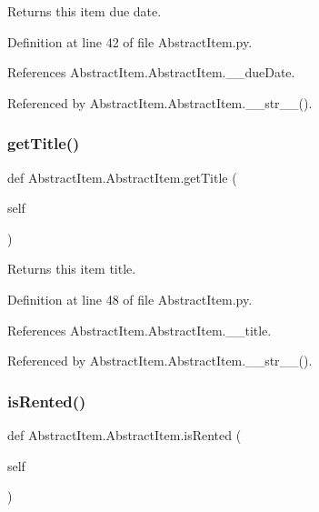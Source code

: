 Returns this item due date. 



Definition at line 42 of file Abstract\+Item.\+py.



References Abstract\+Item.\+Abstract\+Item.\+\_\+\+\_\+due\+Date.



Referenced by Abstract\+Item.\+Abstract\+Item.\+\_\+\+\_\+str\+\_\+\+\_\+().

\mbox{\label{classAbstractItem_1_1AbstractItem_a9ab1907f5110c1047957f2d1f4bebb82}} 
\subsubsection{\texorpdfstring{get\+Title()}{getTitle()}}
{\footnotesize\ttfamily def Abstract\+Item.\+Abstract\+Item.\+get\+Title (\begin{DoxyParamCaption}\item[{}]{self }\end{DoxyParamCaption})}



Returns this item title. 



Definition at line 48 of file Abstract\+Item.\+py.



References Abstract\+Item.\+Abstract\+Item.\+\_\+\+\_\+title.



Referenced by Abstract\+Item.\+Abstract\+Item.\+\_\+\+\_\+str\+\_\+\+\_\+().

\mbox{\label{classAbstractItem_1_1AbstractItem_a566051dd4f0e9b3ba3ce8214a8779244}} 
\subsubsection{\texorpdfstring{is\+Rented()}{isRented()}}
{\footnotesize\ttfamily def Abstract\+Item.\+Abstract\+Item.\+is\+Rented (\begin{DoxyParamCaption}\item[{}]{self }\end{DoxyParamCaption})}




